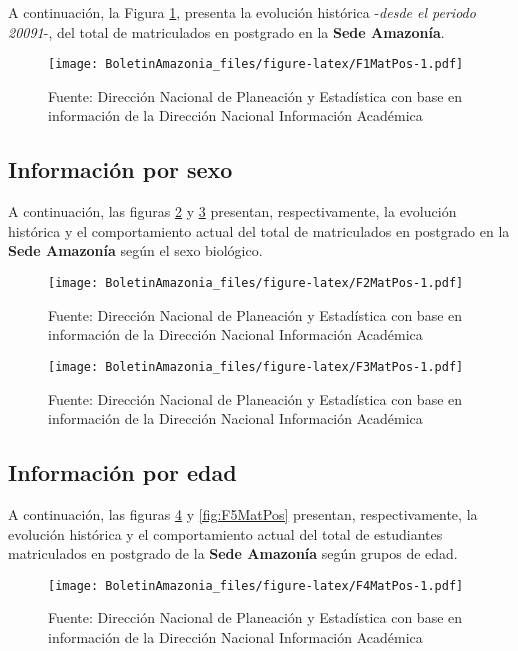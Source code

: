 \documentclass[
]{book}
\begin{document}
A continuación, la Figura \ref{fig:F1MatPos}, presenta la evolución histórica -\emph{desde el periodo 20091}-, del total de matriculados en postgrado en la \textbf{Sede Amazonía}.

\begin{figure}
\centering
\texttt{[image: BoletinAmazonia\_files/figure-latex/F1MatPos-1.pdf]}
\caption{\label{fig:F1MatPos}Fuente: Dirección Nacional de Planeación y Estadística con base en información de la Dirección Nacional Información Académica}
\end{figure}

\hypertarget{informaciuxf3n-por-sexo-7}{%
\subsection{Información por sexo}\label{informaciuxf3n-por-sexo-7}}

A continuación, las figuras \ref{fig:F2MatPos} y \ref{fig:F3MatPos} presentan, respectivamente, la evolución histórica y el comportamiento actual del total de matriculados en postgrado en la \textbf{Sede Amazonía} según el sexo biológico.

\begin{figure}
\centering
\texttt{[image: BoletinAmazonia\_files/figure-latex/F2MatPos-1.pdf]}
\caption{\label{fig:F2MatPos}Fuente: Dirección Nacional de Planeación y Estadística con base en información de la Dirección Nacional Información Académica}
\end{figure}

\begin{figure}
\centering
\texttt{[image: BoletinAmazonia\_files/figure-latex/F3MatPos-1.pdf]}
\caption{\label{fig:F3MatPos}Fuente: Dirección Nacional de Planeación y Estadística con base en información de la Dirección Nacional Información Académica}
\end{figure}

\hypertarget{informaciuxf3n-por-edad-7}{%
\subsection{Información por edad}\label{informaciuxf3n-por-edad-7}}

A continuación, las figuras \ref{fig:F4MatPos} y \ref{fig:F5MatPos} presentan, respectivamente, la evolución histórica y el comportamiento actual del total de estudiantes matriculados en postgrado de la \textbf{Sede Amazonía} según grupos de edad.

\begin{figure}
\centering
\texttt{[image: BoletinAmazonia\_files/figure-latex/F4MatPos-1.pdf]}
\caption{\label{fig:F4MatPos}Fuente: Dirección Nacional de Planeación y Estadística con base en información de la Dirección Nacional Información Académica}
\end{figure}
\end{document}
